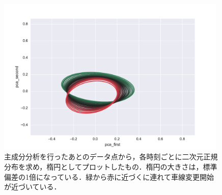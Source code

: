 \begin{figure}[htbp]
  \centering
    \includegraphics[clip,width=11.0cm]{fig/ellipse_pca_first_pca_second.pdf}
    \caption{主成分分析を行ったあとのデータ点から，各時刻ごとに二次元正規分布を求め，楕円としてプロットしたもの．楕円の大きさは，標準偏差の1倍になっている．緑から赤に近づくに連れて車線変更開始が近づいている．}
    \label{fig:pca_gauss}
\end{figure}
